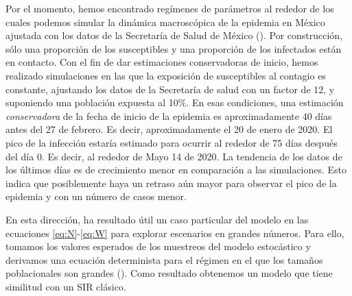  Por el momento, hemos encontrado regímenes de parámetros al rededor de los cuales podemos simular la dinámica macroscópica de la epidemia en México ajustada con los datos de la Secretaría de Salud de México (). Por construcción, sólo una proporción de los susceptibles y una proporción de los infectados están en contacto. Con el fin de dar estimaciones conservadoras de inicio, hemos realizado simulaciones en las que la exposición de susceptibles al contagio es constante, ajustando los datos de la Secretaría de salud  con un factor de 12, y  suponiendo una  población expuesta al 10\%. En esas condiciones, una estimación \textit{conservadora} de la fecha de inicio de la epidemia es aproximadamente 40 días antes del 27 de febrero. Es decir, aproximadamente el 20 de enero de 2020. El pico de la infección estaría estimado para ocurrir al rededor de 75 días después del día 0. Es decir, al rededor de Mayo 14 de 2020. La tendencia de los datos de los últimos días es de crecimiento menor en comparación a las simulaciones. Esto indica que posiblemente haya un retraso aún mayor para observar el pico de la epidemia y con un número de casos menor.

En esta dirección, ha resultado útil un caso particular del modelo en las ecuaciones \eqref{eq:N}-\eqref{eq:W}  para explorar escenarios en grandes números.
 Para ello, tomamos los valores esperados de los muestreos del modelo estocástico y derivamos una ecuación determinista para el régimen en el que los tamaños poblacionales son grandes (). Como resultado obtenemos un modelo que tiene similitud con un SIR clásico.  

